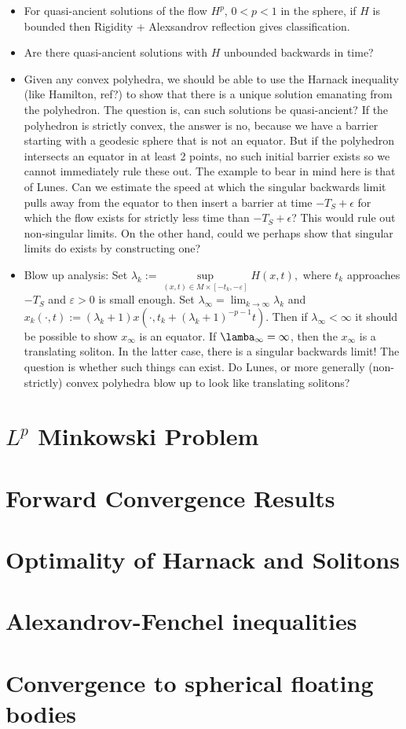 \documentclass{amsart}
\begin{document}
\begin{itemize}
\item For quasi-ancient solutions of the flow $H^p$, $0<p<1$ in the sphere, if $H$ is bounded then Rigidity + Alexsandrov reflection gives classification.
\item Are there quasi-ancient solutions with $H$ unbounded backwards in time?
\item Given any convex polyhedra, we should be able to use the Harnack inequality (like Hamilton, ref?) to show that there is a unique solution emanating from the polyhedron. The question is, can such solutions be quasi-ancient? If the polyhedron is strictly convex, the answer is no, because we have a barrier starting with a geodesic sphere that is not an equator. But if the polyhedron intersects an equator in at least 2 points, no such initial barrier exists so we cannot immediately rule these out. The example to bear in mind here is that of Lunes. Can we estimate the speed at which the singular backwards limit pulls away from the equator to then insert a barrier at time $-T_S + \epsilon$ for which the flow exists for strictly less time than $-T_S + \epsilon$? This would rule out non-singular limits. On the other hand, could we perhaps show that singular limits do exists by constructing one?
\item Blow up analysis: Set $\lambda_k := \sup\limits_{(x,t)\in M\times [-t_k,-\varepsilon]} H(x,t),$ where $t_k$ approaches $-T_S$ and $\varepsilon>0$ is small enough. Set $\lambda_{\infty}=\lim_{k\to\infty}\lambda_k$ and $x_k(\cdot,t):=(\lambda_k+1)x(\cdot, t_k+(\lambda_k+1)^{-p-1}t)$. Then if $\lambda_{\infty} < \infty$ it should be possible to show $x_{\infty}$ is an equator. If $\lamba_{\infty} = \infty$, then the $x_{\infty}$ is a translating soliton. In the latter case, there is a singular backwards limit! The question is whether such things can exist. Do Lunes, or more generally (non-strictly) convex polyhedra blow up to look like translating solitons?
\end{itemize}

\section{$L^p$ Minkowski Problem}

\section{Forward Convergence Results}

\section{Optimality of Harnack and Solitons}

\section{Alexandrov-Fenchel inequalities}

\section{Convergence to spherical floating bodies}





\end{document}
